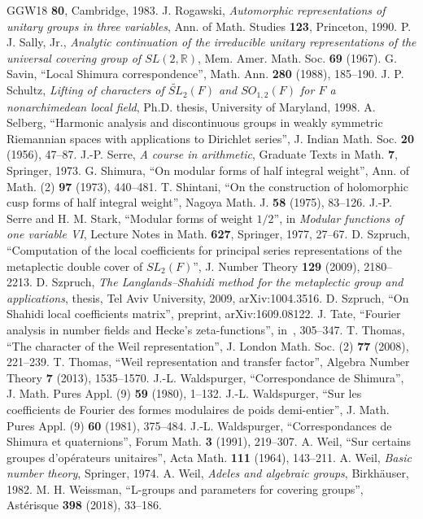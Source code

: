 \documentclass[12pt,letterpaper,openany]{book}
\numberwithin{equation}{chapter}
\theoremstyle{plain}
\theoremstyle{definition}
\theoremstyle{remark}
\theoremstyle{plain}
\begin{document}
\begin{thebibliography}{GGW18}
\textbf{80}, Cambridge, 1983.
 J. Rogawski, \emph{Automorphic representations of unitary groups
in three variables}, Ann. of Math. Studies \textbf{123}, Princeton, 1990.
 P. J. Sally, Jr., \emph{Analytic continuation of the
irreducible unitary representations of the universal covering group of
$SL(2,\mathbb{R})$}, Mem. Amer. Math. Soc. \textbf{69} (1967).
 G. Savin, ``Local Shimura correspondence'', Math. Ann.
\textbf{280} (1988), 185--190.
 J. P. Schultz, \emph{Lifting of characters of
$\widetilde{SL}_2(F)$ and $SO_{1,2}(F)$ for $F$ a nonarchimedean local
field}, Ph.D. thesis, University of Maryland, 1998.
 A. Selberg, ``Harmonic analysis and discontinuous groups
in weakly symmetric Riemannian spaces with applications to Dirichlet
series'', J. Indian Math. Soc. \textbf{20} (1956), 47--87.
 J.-P. Serre, \emph{A course in arithmetic}, Graduate Texts in
Math. \textbf{7}, Springer, 1973.
 G. Shimura, ``On modular forms of half integral weight'',
Ann. of Math. (2) \textbf{97} (1973), 440--481.
 T. Shintani, ``On the construction of holomorphic cusp
forms of half integral weight'', Nagoya Math. J. \textbf{58} (1975),
83--126.
 J.-P. Serre and H. M. Stark, ``Modular forms of weight
$1/2$'', in \emph{Modular functions of one variable VI}, Lecture Notes in
Math. \textbf{627}, Springer, 1977, 27--67.
 D. Szpruch, ``Computation of the local coefficients for
principal series representations of the metaplectic double cover of
$SL_2(F)$'', J. Number Theory \textbf{129} (2009), 2180--2213.
 D. Szpruch, \emph{The Langlands--Shahidi method for
the metaplectic group and applications}, thesis, Tel Aviv University,
2009, arXiv:1004.3516.
 D. Szpruch, ``On Shahidi local coefficients matrix'',
preprint, arXiv:1609.08122.
 J. Tate, ``Fourier analysis in number fields and Hecke's
zeta-functions'', in~\cite{CF67}, 305--347.
 T. Thomas, ``The character of the Weil
representation'', J. London Math. Soc. (2) \textbf{77} (2008), 221--239.
 T. Thomas, ``Weil representation and transfer
factor'', Algebra Number Theory \textbf{7} (2013), 1535--1570.
 J.-L. Waldspurger, ``Correspondance de Shimura'', J. Math.
Pures Appl. (9) \textbf{59} (1980), 1--132.
 J.-L. Waldspurger, ``Sur les coefficients de Fourier
des formes modulaires de poids demi-entier'', J. Math. Pures Appl. (9)
\textbf{60} (1981), 375--484.
 J.-L. Waldspurger, ``Correspondances de Shimura et
quaternions'', Forum Math. \textbf{3} (1991), 219--307.
 A. Weil, ``Sur certains groupes d'op\'erateurs
unitaires'', Acta Math. \textbf{111} (1964), 143--211.
 A. Weil, \emph{Basic number theory}, Springer, 1974.
 A. Weil, \emph{Adeles and algebraic groups}, Birkh\"auser, 1982.
 M. H. Weissman, ``L-groups and parameters for covering
groups'', Ast\'erisque \textbf{398} (2018), 33--186.
\end{thebibliography}
\end{document}

